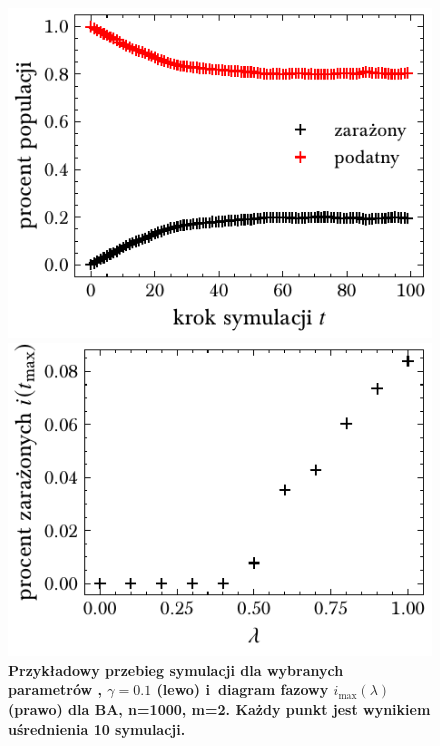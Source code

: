\documentclass[13pt,a4paper]{article}
\begin{document}
\begin{figure}[ht!]
	\begin{minipage}[t]{0.49\textwidth}
		\centering
		\includegraphics[width=\textwidth]{../figures/beta/ba_infected_vs_step.pdf}
	\end{minipage}
	\hspace{\fill}
	\begin{minipage}[t]{0.49\textwidth}
		\centering
		\includegraphics[width=\textwidth]{../figures/beta/ba_infected_vs_ratio.pdf}
	\end{minipage}
	\caption{\centering\textbf{Przykładowy przebieg symulacji dla wybranych parametrów , $\gamma=0.1$ (lewo) i diagram fazowy $i_{\max}(\lambda)$ (prawo) dla BA, n=1000, m=2. Każdy punkt jest wynikiem uśrednienia 10 symulacji.}}
\end{figure}
\end{document}
